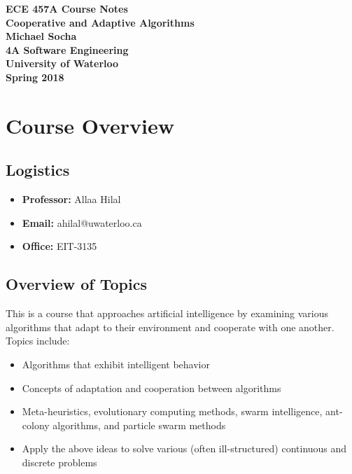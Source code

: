 \documentclass[12pt,titlepage]{article}
\begin{document}
  \begin{titlepage}
    \vspace*{\fill}
    \centering

    \textbf{\Huge ECE 457A Course Notes} \\ [0.4em]
    \textbf{\Large Cooperative and Adaptive Algorithms} \\ [1em]
    \textbf{\Large Michael Socha} \\ [1em]
    \textbf{\large 4A Software Engineering} \\
    \textbf{\large University of Waterloo} \\
    \textbf{\large Spring 2018} \\
    \vspace*{\fill}
  \end{titlepage}

  \newpage 

  \tableofcontents

  \newpage

  \section{Course Overview}
    \subsection{Logistics}
      \begin{itemize}
        \item \textbf{Professor:} Allaa Hilal
        \item \textbf{Email:} ahilal@uwaterloo.ca
        \item \textbf{Office:} EIT-3135
      \end{itemize}

    \subsection{Overview of Topics}
      This is a course that approaches artificial intelligence by examining various algorithms that adapt to their
      environment and cooperate with one another. Topics include:
      \begin{itemize}
        \item Algorithms that exhibit intelligent behavior
        \item Concepts of adaptation and cooperation between algorithms
        \item Meta-heuristics, evolutionary computing methods, swarm intelligence, ant-colony algorithms, and particle
        swarm methods
        \item Apply the above ideas to solve various (often ill-structured) continuous and discrete problems
      \end{itemize}
\end{document}
